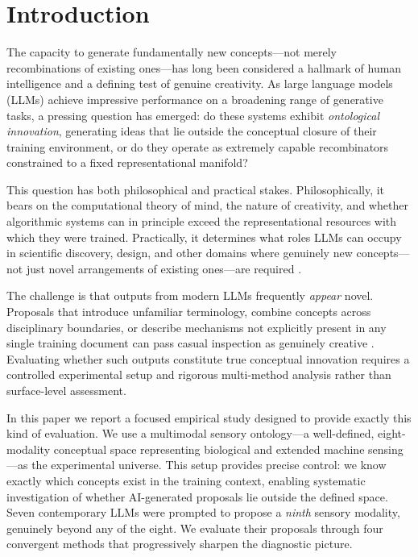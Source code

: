 \documentclass[pdflatex,sn-mathphys-num]{sn-jnl}
\begin{document}
\maketitle

\section{Introduction}
\label{sec:intro}

The capacity to generate fundamentally new concepts---not merely recombinations of existing
ones---has long been considered a hallmark of human intelligence and a defining test of genuine
creativity.  As large language models (LLMs) achieve impressive performance on a broadening
range of generative tasks, a pressing question has emerged: do these systems exhibit
\emph{ontological innovation}, generating ideas that lie outside the conceptual closure of their
training environment, or do they operate as extremely capable recombinators constrained to a
fixed representational manifold?

This question has both philosophical and practical stakes.  Philosophically, it bears on the
computational theory of mind, the nature of creativity, and whether algorithmic systems can in
principle exceed the representational resources with which they were trained.  Practically, it
determines what roles LLMs can occupy in scientific discovery, design, and other domains where
genuinely new concepts---not just novel arrangements of existing ones---are required
\cite{kuhn1962structure}.

The challenge is that outputs from modern LLMs frequently \emph{appear} novel.  Proposals that
introduce unfamiliar terminology, combine concepts across disciplinary boundaries, or describe
mechanisms not explicitly present in any single training document can pass casual inspection as
genuinely creative \cite{wiggins2006preliminary,colton2012computational}.  Evaluating whether
such outputs constitute true conceptual innovation requires a controlled experimental setup and
rigorous multi-method analysis rather than surface-level assessment.

In this paper we report a focused empirical study designed to provide exactly this kind of
evaluation.  We use a multimodal sensory ontology---a well-defined, eight-modality conceptual
space representing biological and extended machine sensing---as the experimental universe.
This setup provides precise control: we know exactly which concepts exist in the training
context, enabling systematic investigation of whether AI-generated proposals lie outside the
defined space.  Seven contemporary LLMs were prompted to propose a \emph{ninth} sensory
modality, genuinely beyond any of the eight.  We evaluate their proposals through four
convergent methods that progressively sharpen the diagnostic picture.
\end{document}

